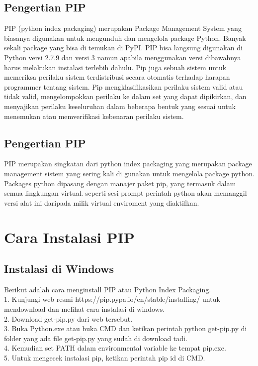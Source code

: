\subsection{Pengertian PIP}
PIP (python index packaging) merupakan Package Management System yang biasanya digunakan untuk mengunduh dan mengelola package Python. Banyak sekali package yang bisa di temukan di PyPI. 
PIP bisa langsung digunakan di Python versi 2.7.9 dan versi 3 namun apabila menggunakan versi dibawahnya harus melakukan instalasi terlebih dahulu. 
Pip juga sebuah sistem untuk memeriksa perilaku sistem terdistribusi secara otomatis terhadap harapan programmer tentang sistem. Pip mengklasifikasikan perilaku sistem valid atau tidak valid, mengelompokkan perilaku ke dalam set yang dapat dipikirkan, dan menyajikan perilaku keseluruhan dalam beberapa bentuk yang sesuai untuk menemukan atau memverifikasi kebenaran perilaku sistem.
\subsection{Pengertian PIP}
PIP merupakan singkatan dari python index packaging yang merupakan package management sistem yang sering kali di gunakan untuk mengelola package python. Packages python dipasang dengan manajer paket pip, yang termasuk dalam semua lingkungan virtual. seperti sesi prompt perintah python akan memanggil versi alat ini daripada milik virtual enviroment yang diaktifkan.

\section{Cara Instalasi PIP}
\subsection{Instalasi di Windows}
Berikut adalah cara menginstall PIP atau Python Index Packaging. \\
1.	Kunjungi web resmi https://pip.pypa.io/en/stable/installing/ untuk mendownload dan melihat cara instalasi di windows.\\
2.	Download get-pip.py dari web tersebut. \\
3.	Buka Python.exe atau buka CMD dan ketikan perintah python get-pip.py di folder yang ada file get-pip.py yang sudah di 	download tadi.\\
4.	Kemudian set PATH dalam environmental variable ke tempat pip.exe. \\
5.	Untuk mengecek instalasi pip, ketikan perintah pip id di CMD. \\
